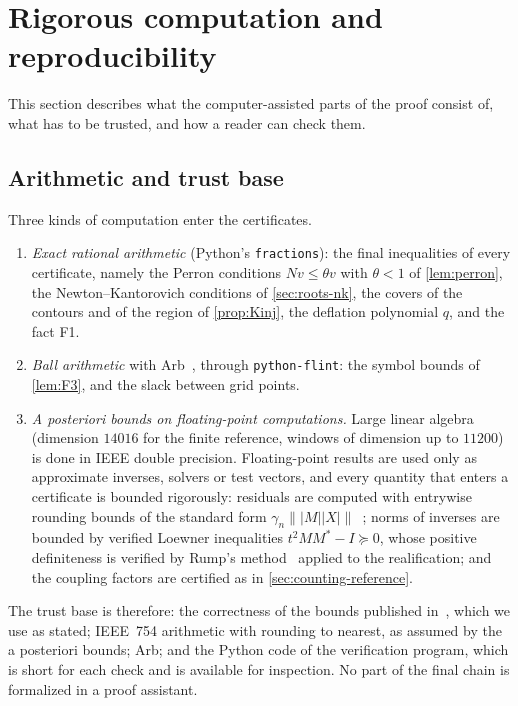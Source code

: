 \section{Rigorous computation and reproducibility}\label{sec:computation}

This section describes what the computer-assisted parts of the proof consist of, what has to be trusted, and how
a reader can check them.

\subsection{Arithmetic and trust base}\label{sec:computation-arith}

Three kinds of computation enter the certificates.
\begin{enumerate}[label=(\alph*),leftmargin=*]
\item \emph{Exact rational arithmetic} (Python's \texttt{fractions}): the final inequalities of every
  certificate, namely the Perron conditions $Nv\le\theta v$ with $\theta<1$ of
  \cref{lem:perron}, the Newton--Kantorovich conditions of \cref{sec:roots-nk}, the covers of the contours and of
  the region of \cref{prop:Kinj}, the deflation polynomial $q$, and the fact F1.
\item \emph{Ball arithmetic} with Arb~\cite{Arb}, through \texttt{python-flint}: the symbol bounds of
  \cref{lem:F3}, and the slack between grid points.
\item \emph{A posteriori bounds on floating-point computations.} Large linear algebra (dimension $14016$ for the
  finite reference, windows of dimension up to $11200$) is done in IEEE double precision. Floating-point results
  are used only as approximate inverses, solvers or test vectors, and every quantity that enters a certificate is
  bounded rigorously: residuals are computed with entrywise rounding bounds of the standard form
  $\gamma_n\||M||X|\|$~\cite{Higham2002}; norms of inverses are bounded by verified Loewner inequalities
  $t^2MM^*-I\succeq0$, whose positive definiteness is verified by Rump's method~\cite{Rump2006} applied to the
  realification; and the coupling factors are certified as in \cref{sec:counting-reference}.
\end{enumerate}
The trust base is therefore: the correctness of the bounds published in~\cite{RT2019}, which we use as stated;
IEEE~754 arithmetic with rounding to nearest, as assumed by the a posteriori bounds; Arb; and the Python code of the
verification program, which is short for each check and is available for inspection. No part of the final chain
is formalized in a proof assistant.

